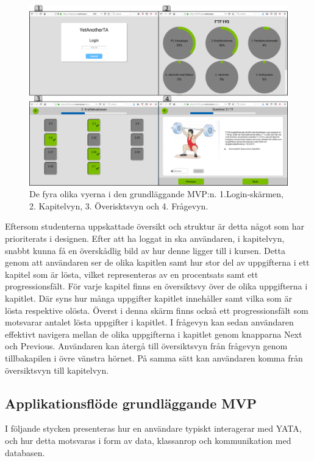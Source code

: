 \begin{center}
\begin{figure}[H]
    \centering
    \includegraphics[width=1.0\textwidth]{images/resultpictures/4pics1website.png}
    \caption{De fyra olika vyerna i den grundläggande MVP:n. 1.Login-skärmen, 2. Kapitelvyn, 3. Överisktsvyn och 4. Frågevyn. }
    \label{fig:raket4}
\end{figure}
\end{center}


Eftersom studenterna uppskattade översikt och struktur är detta något som har prioriterats i designen. Efter att ha loggat in ska användaren, i kapitelvyn, snabbt kunna få en överskådlig bild av hur denne ligger till i kursen. Detta genom att användaren ser de olika kapitlen samt hur stor del av uppgifterna i ett kapitel som är lösta, vilket representeras av en procentsats samt ett progressionsfält. För varje kapitel finns en översiktsvy över de olika uppgifterna i kapitlet. Där syns hur många uppgifter kapitlet innehåller samt vilka som är lösta respektive olösta. Överst i denna skärm finns också ett progressionsfält som motsvarar antalet lösta uppgifter i kapitlet. I frågevyn kan sedan användaren effektivt navigera mellan de olika uppgifterna i kapitlet genom knapparna Next och Previous. Användaren kan återgå till översiktsvyn från frågevyn genom tillbakapilen i övre vänstra hörnet. På samma sätt kan användaren komma från översiktsvyn till kapitelvyn. 




\subsection{Applikationsflöde grundläggande MVP}
I följande stycken presenteras hur en användare typiskt interagerar med YATA, och hur detta motsvaras i form av data, klassanrop och kommunikation med databasen.

